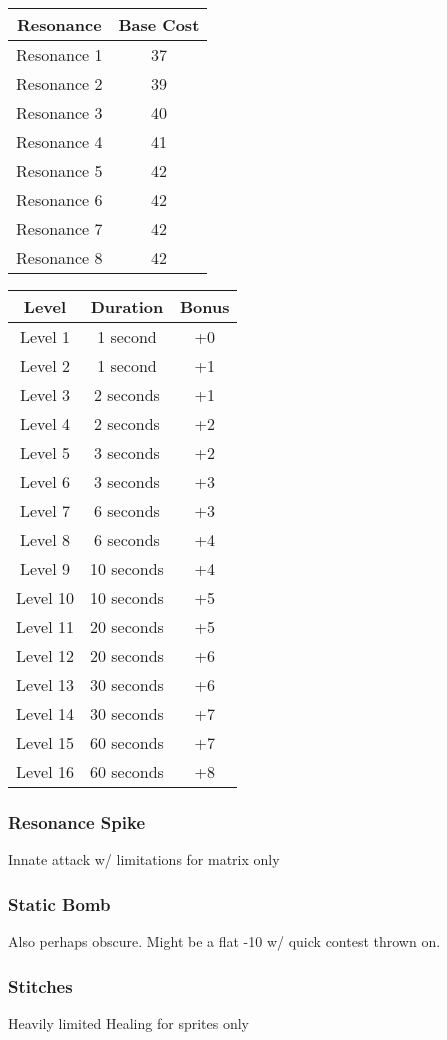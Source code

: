 \begin{multicols*}{3}
	\begin{center}
		\begin{tabular}{|c|c|}
			\hline
			Resonance & Base Cost\\
			\hline
			\hline
			Resonance 1 & 37 \\
			Resonance 2 & 39 \\
			Resonance 3 & 40 \\
			Resonance 4 & 41 \\
			Resonance 5 & 42 \\
			Resonance 6 & 42 \\
			Resonance 7 & 42 \\
			Resonance 8 & 42 \\
			\hline
		\end{tabular}
	\end{center}
	
	\begin{center}
		\begin{tabular}{|c|c|c|}
			\hline
			Level & Duration & Bonus\\
			\hline
			\hline
			Level 1 & 1 second & +0 \\
			Level 2 & 1 second & +1 \\
			Level 3 & 2 seconds & +1 \\
			Level 4 & 2 seconds & +2 \\
			Level 5 & 3 seconds & +2 \\
			Level 6 & 3 seconds & +3 \\
			Level 7 & 6 seconds & +3 \\
			Level 8 & 6 seconds & +4 \\
			Level 9 & 10 seconds & +4 \\
			Level 10 & 10 seconds & +5 \\
			Level 11 & 20 seconds & +5 \\
			Level 12 & 20 seconds & +6 \\
			Level 13 & 30 seconds & +6 \\
			Level 14 & 30 seconds & +7 \\
			Level 15 & 60 seconds & +7 \\
			Level 16 & 60 seconds & +8 \\
			\hline
		\end{tabular}
	\end{center}
	
	\subsubsection*{Resonance Spike}
	
	Innate attack w/ limitations for matrix only
	
	\subsubsection*{Static Bomb}
	
	Also perhaps obscure. Might be a flat -10 w/ quick contest thrown on.
	
	\subsubsection*{Stitches}
	
	Heavily limited Healing for sprites only
	
\end{multicols*}